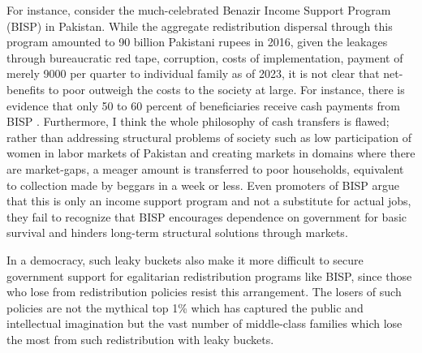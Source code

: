 \documentclass[12pt]{article}
\newcommand{\1}{\mathbbm 1}
\begin{document}
		 For instance, consider the much-celebrated Benazir Income Support Program (BISP) in Pakistan. While the aggregate redistribution dispersal through this program amounted to 90 billion Pakistani rupees in 2016, given the leakages through bureaucratic red tape, corruption, costs of implementation, payment of merely 9000 per quarter to individual family as of 2023, it is not clear that net-benefits to poor outweigh the costs to the society at large. For instance, there is evidence that only 50 to 60 percent of beneficiaries receive cash payments from BISP \cite{ahmad2018}. Furthermore, I think the whole philosophy of cash transfers is flawed; rather than addressing structural problems of society such as low participation of women in labor markets of Pakistan and creating markets in domains where there are market-gaps, a meager amount is transferred to poor households, equivalent to collection made by beggars in a week or less. Even promoters of BISP argue that this is only an income support program and not a substitute for actual jobs, they fail to recognize that BISP encourages dependence on government for basic survival and hinders long-term structural solutions through markets.
		 
		 
		 
		
		
		In a democracy, such leaky buckets also make it more difficult to secure government support for egalitarian redistribution programs like BISP, since those who lose from redistribution policies resist this arrangement. The losers of such policies are not the mythical top 1\% which has captured the public and intellectual imagination but the vast number of middle-class families which lose the most from such redistribution with leaky buckets.
		
		
\end{document}
